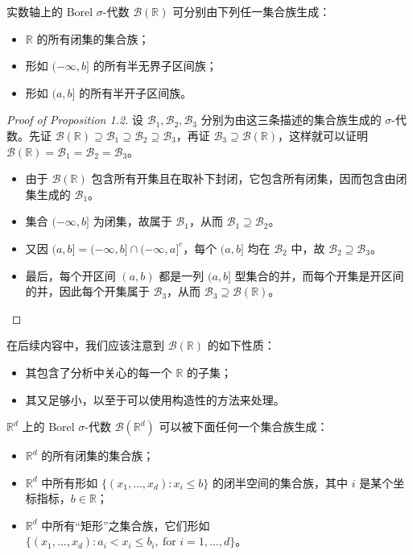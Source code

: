 \documentclass[11pt]{article}
\newcommand{\RR}{\mathbb{R}}
\newcommand{\calB}{\mathcal{B}}
\begin{document}
\begin{proposition}
    实数轴上的 Borel $\sigma$-代数 $\calB(\RR)$ 可分别由下列任一集合族生成：
    \begin{itemize}
        \item $\RR$ 的所有闭集的集合族；
        \item 形如 $(-\infty,b]$ 的所有半无界子区间族；
        \item 形如 $(a,b]$ 的所有半开子区间族。
    \end{itemize}
\end{proposition}

\begin{proof}[Proof of Proposition 1.2]
    设 $\calB_1,\calB_2,\calB_3$ 分别为由这三条描述的集合族生成的 $\sigma$-代数。先证 $\calB(\RR) \supseteq \calB_1 \supseteq \calB_2 \supseteq \calB_3$，再证 $\calB_3 \supseteq \calB(\RR)$，这样就可以证明 $\calB(\RR) = \calB_1 = \calB_2 = \calB_3$。
    \begin{itemize}
        \item 由于 $\calB(\RR)$ 包含所有开集且在取补下封闭，它包含所有闭集，因而包含由闭集生成的 $\calB_1$。
        \item 集合 $(-\infty,b]$ 为闭集，故属于 $\calB_1$，从而 $\calB_1 \supseteq \calB_2$。
        \item 又因 $(a,b] = (-\infty,b] \cap (-\infty,a]^c$，每个 $(a,b]$ 均在 $\calB_2$ 中，故 $\calB_2 \supseteq \calB_3$。
        \item 最后，每个开区间 $(a,b)$ 都是一列 $(a,b]$ 型集合的并，而每个开集是开区间的并，因此每个开集属于 $\calB_3$，从而 $\calB_3 \supseteq \calB(\RR)$。
    \end{itemize}
\end{proof}

在后续内容中，我们应该注意到 $\calB(\RR)$ 的如下性质：
\begin{itemize}
    \item 其包含了分析中关心的每一个 $\RR$ 的子集；
    \item 其又足够小，以至于可以使用构造性的方法来处理。
\end{itemize}

\begin{proposition}
    $\RR^d$ 上的 Borel $\sigma$-代数 $\calB(\RR^d)$ 可以被下面任何一个集合族生成：
    \begin{itemize}
        \item $\RR^d$ 的所有闭集的集合族；
        \item $\RR^d$ 中所有形如 $\{(x_1,\dots,x_d): x_i \le b\}$ 的闭半空间的集合族，其中 $i$ 是某个坐标指标，$b \in \RR$；
        \item $\RR^d$ 中所有“矩形”之集合族，它们形如 $\{(x_1,\dots,x_d): a_i < x_i \le b_i,\ \text{for } i = 1,\dots,d\}$。
    \end{itemize}
\end{proposition}
\end{document}
